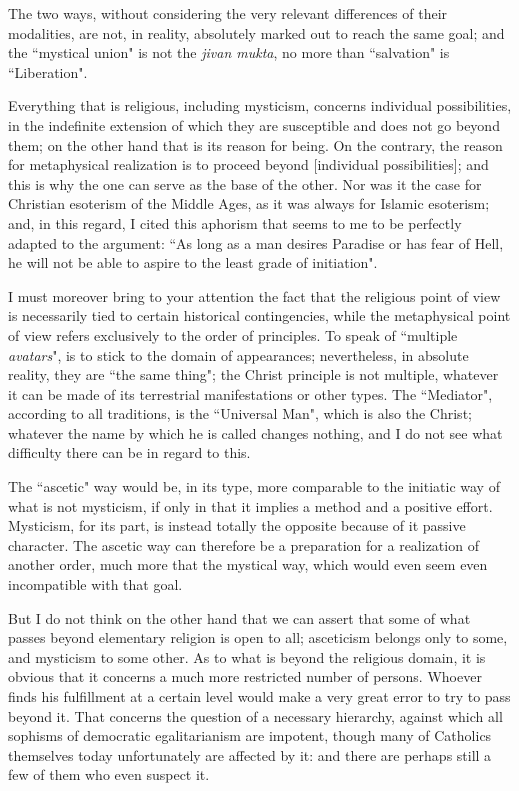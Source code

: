 The two ways, without considering the very relevant differences of their modalities, are not, in reality, absolutely marked out to reach the same goal; and the ``mystical union" is not the \emph{jivan mukta}, no more than ``salvation" is ``Liberation".

Everything that is religious, including mysticism, concerns individual possibilities, in the indefinite extension of which they are susceptible and does not go beyond them; on the other hand that is its reason for being. On the contrary, the reason for metaphysical realization is to proceed beyond [individual possibilities]; and this is why the one can serve as the base of the other. Nor was it the case for Christian esoterism of the Middle Ages, as it was always for Islamic esoterism; and, in this regard, I cited this aphorism that seems to me to be perfectly adapted to the argument: ``As long as a man desires Paradise or has fear of Hell, he will not be able to aspire to the least grade of initiation".

I must moreover bring to your attention the fact that the religious point of view is necessarily tied to certain historical contingencies, while the metaphysical point of view refers exclusively to the order of principles. To speak of ``multiple \emph{avatars}", is to stick to the domain of appearances; nevertheless, in absolute reality, they are ``the same thing"; the Christ principle is not multiple, whatever it can be made of its terrestrial manifestations or other types. The ``Mediator", according to all traditions, is the ``Universal Man", which is also the Christ; whatever the name by which he is called changes nothing, and I do not see what difficulty there can be in regard to this.

The ``ascetic" way would be, in its type, more comparable to the initiatic way of what is not mysticism, if only in that it implies a method and a positive effort. Mysticism, for its part, is instead totally the opposite because of it passive character. The ascetic way can therefore be a preparation for a realization of another order, much more that the mystical way, which would even seem even incompatible with that goal.

But I do not think on the other hand that we can assert that some of what passes beyond elementary religion is open to all; asceticism belongs only to some, and mysticism to some other. As to what is beyond the religious domain, it is obvious that it concerns a much more restricted number of persons. Whoever finds his fulfillment at a certain level would make a very great error to try to pass beyond it. That concerns the question of a necessary hierarchy, against which all sophisms of democratic egalitarianism are impotent, though many of Catholics themselves today unfortunately are affected by it: and there are perhaps still a few of them who even suspect it.

